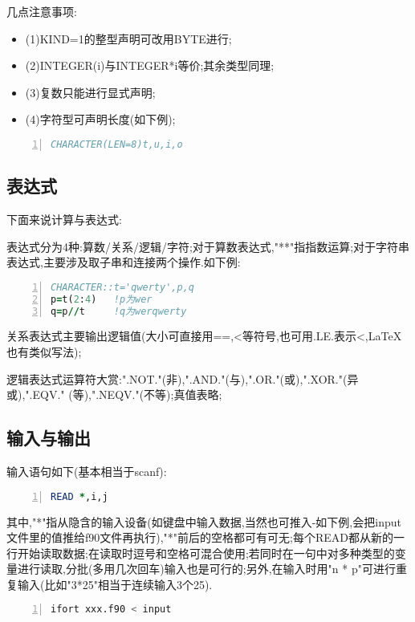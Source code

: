 几点注意事项:
\begin{itemize}
	\item{(1)KIND=1的整型声明可改用BYTE进行;}
	\item{(2)INTEGER(i)与INTEGER*i等价;其余类型同理;}
	\item{(3)复数只能进行显式声明;}
	\item{(4)字符型可声明长度(如下例);}
\end{itemize}

\begin{lstlisting}[numbers=left,frame=single,language=Fortran]
CHARACTER(LEN=8)t,u,i,o
\end{lstlisting}
\par

\subsection{表达式}
下面来说计算与表达式:\par
表达式分为4种:算数/关系/逻辑/字符;对于算数表达式,"**"指指数运算;对于字符串表达式,主要涉及取子串和连接两个操作.如下例:

\begin{lstlisting}[numbers=left,frame=single,language=Fortran]
CHARACTER::t='qwerty',p,q
p=t(2:4)   !p为wer
q=p//t     !q为werqwerty
\end{lstlisting}
\par

关系表达式主要输出逻辑值(大小可直接用==,<等符号,也可用.LE.表示<,\LaTeX 也有类似写法);\par

逻辑表达式运算符大赏:".NOT."(非),".AND."(与),".OR."(或),".XOR."(异或),".EQV." (等),".NEQV."(不等);真值表略;

\subsection{输入与输出}
输入语句如下(基本相当于scanf):

\begin{lstlisting}[numbers=left,frame=single,language=Fortran]
READ *,i,j
\end{lstlisting}
\par

其中,"*"指从隐含的输入设备(如键盘中输入数据,当然也可推入-如下例,会把input文件里的值推给f90文件再执行),"*"前后的空格都可有可无;每个READ都从新的一行开始读取数据;在读取时逗号和空格可混合使用;若同时在一句中对多种类型的变量进行读取,分批(多用几次回车)输入也是可行的;另外,在输入时用"n * p"可进行重复输入(比如"3*25"相当于连续输入3个25).
\begin{lstlisting}[numbers=left,frame=single,language=Fortran]
ifort xxx.f90 < input
\end{lstlisting}
\par


